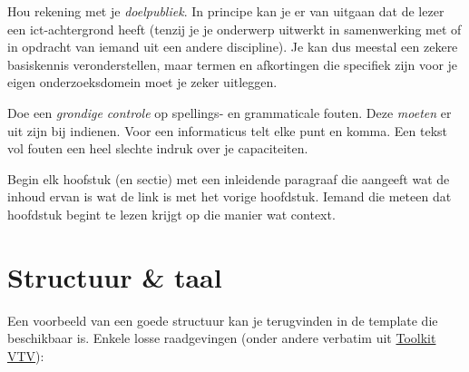 

%

Hou rekening met je \emph{doelpubliek}. In principe kan je er van uitgaan dat de lezer een ict-achtergrond heeft (tenzij je je onderwerp uitwerkt in samenwerking met of in opdracht van iemand uit een andere discipline). Je kan dus meestal een zekere basiskennis veronderstellen, maar termen en afkortingen die specifiek zijn voor je eigen onderzoeksdomein moet je zeker uitleggen.

Doe een \emph{grondige controle} op spellings- en grammaticale fouten. Deze \emph{moeten} er uit zijn bij indienen. Voor een informaticus telt elke punt en komma. Een tekst vol fouten een heel slechte indruk over je capaciteiten.

Begin elk hoofstuk (en sectie) met een inleidende paragraaf die aangeeft wat de inhoud ervan is wat de link is met het vorige hoofdstuk. Iemand die meteen dat hoofdstuk begint te lezen krijgt op die manier wat context.




%

\section{Structuur \& taal}
\label{sec:structuur}
Een voorbeeld van een goede structuur kan je terugvinden in de template die beschikbaar is. Enkele losse raadgevingen (onder andere verbatim uit \href{http://www.toolkitvtv.nl/organisatie-en-proces/redactierichtlijnen/heldere-taal-gebruiken/index.html#Objectiefformuleren}{Toolkit VTV}):

